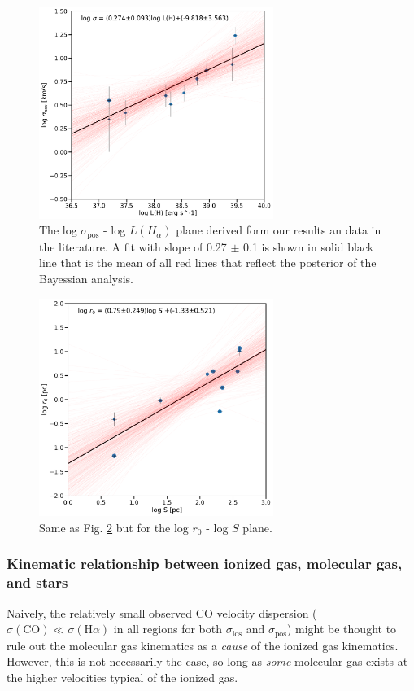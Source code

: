 \documentclass[fleqn,usenatbib, useAMS, a4paper]{mnras}
\newcommand\pos{\ensuremath{_{\mathrm{pos}}}}
\newcommand\los{\ensuremath{_{\mathrm{los}}}}
\newcommand\ha{\ensuremath{\text{H}\alpha}}
\newcommand*\chem[1]{\ensuremath{\mathrm{#1}}}
\begin{document}


\begin{figure}
\centering 
\includegraphics[width=3in]{Figures/corr-svsL}
\caption{The log \(\sigma\pos\) - log $L(H_{\alpha})$ plane derived form our results an data in the literature. A fit with slope of 0.27 $\pm$ 0.1 is shown in solid black line that is the mean of all red lines that reflect the posterior of the Bayessian analysis. }
\label{fig:sigvsl}
\end{figure}

\begin{figure}
\centering 
\includegraphics[width=3in]{Figures/corr-rvsS}
\caption{Same as Fig. \ref{fig:rvsR} but for the log \(r_0\) - log \(S\) plane. }
\label{fig:rvsR}
\end{figure}


\subsubsection{Kinematic relationship between ionized gas, molecular gas, and stars}
\label{sec:kinem-rela-betw}

Naively, the relatively small observed CO velocity dispersion
(\(\sigma(\chem{CO}) \ll \sigma(\ha)\) in all regions
for both \(\sigma\los\) and \(\sigma\pos\))
might be thought to rule out the molecular gas kinematics
as a \emph{cause} of the ionized gas kinematics.
However, this is not necessarily the case, so long as \emph{some} molecular gas
exists at the higher velocities typical of the ionized gas.
\end{document}
